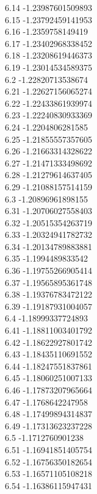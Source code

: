 {6.14	-1.23987601509893\\
6.15	-1.23792459141953\\
6.16	-1.2359758149419\\
6.17	-1.23402968338452\\
6.18	-1.23208619446373\\
6.19	-1.23014534589375\\
6.2	-1.22820713538674\\
6.21	-1.22627156065274\\
6.22	-1.22433861939974\\
6.23	-1.22240830933369\\
6.24	-1.2204806281585\\
6.25	-1.21855557357605\\
6.26	-1.21663314328622\\
6.27	-1.21471333498692\\
6.28	-1.21279614637405\\
6.29	-1.21088157514159\\
6.3	-1.20896961898155\\
6.31	-1.20706027558403\\
6.32	-1.20515354263719\\
6.33	-1.20324941782732\\
6.34	-1.20134789883881\\
6.35	-1.1994489833542\\
6.36	-1.19755266905414\\
6.37	-1.19565895361748\\
6.38	-1.19376783472122\\
6.39	-1.19187931004057\\
6.4	-1.18999337724893\\
6.41	-1.18811003401792\\
6.42	-1.18622927801742\\
6.43	-1.18435110691552\\
6.44	-1.18247551837861\\
6.45	-1.18060251007133\\
6.46	-1.17873207965664\\
6.47	-1.1768642247958\\
6.48	-1.17499894314837\\
6.49	-1.17313623237228\\
6.5	-1.1712760901238\\
6.51	-1.16941851405754\\
6.52	-1.16756350182654\\
6.53	-1.16571105108218\\
6.54	-1.16386115947431\\
}
